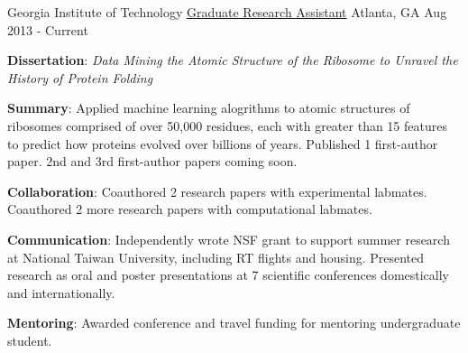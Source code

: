 

\begin{cventries}

  \cventry
    {Georgia Institute of Technology} %
    {\href{https://scholar.google.com/citations?hl=en&user=KIFFrX4AAAAJ&view_op=list_works&gmla=AJsN-F6ZS9ZeLqMG4o6JCZS87HLjoP76wA4kFValw4xx0A6ZWJJoxCWe2xu6VZvt_LgEw9YpCglVTlKY_5PfKpxiyghYFxLPNm5zrUwdBE5Fn-Sr098nt7NJGM2cH5l47IrTsSra8Vob}{Graduate Research Assistant}} %
    {Atlanta, GA} %
    {Aug 2013 - Current} %
    {{\textbf{Dissertation}: \textit{Data Mining the Atomic Structure of the Ribosome to Unravel the History of Protein Folding}}
      \begin{cvitems} %
      \vspace{4.0mm}
        \item \textbf{Summary}: Applied machine learning alogrithms to atomic structures of ribosomes comprised of over 50,000 residues, each with greater than 15 features to predict how proteins evolved over billions of years. Published 1 first-author paper. 2nd and 3rd first-author papers coming soon.
        \item \textbf{Collaboration}: Coauthored 2 research papers with experimental labmates. Coauthored 2 more research papers with computational labmates.
        \item \textbf{Communication}: Independently wrote NSF grant to support summer research at National Taiwan University, including RT flights and housing. Presented research as oral and poster presentations at 7 scientific conferences domestically and internationally.
        \item \textbf{Mentoring}: Awarded conference and travel funding for mentoring undergraduate student.
      \end{cvitems}
    }


\end{cventries}
